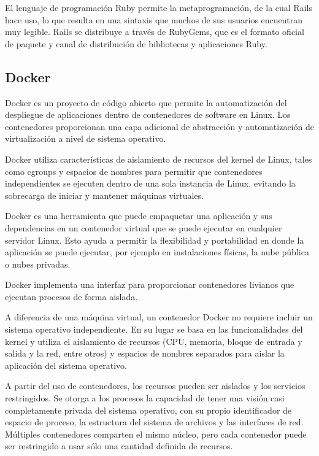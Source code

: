 El lenguaje de programación Ruby permite la metaprogramación, de la cual Rails
hace uso, lo que resulta en una sintaxis que muchos de sus usuarios encuentran
muy legible. Rails se distribuye a través de RubyGems, que es el formato
oficial de paquete y canal de distribución de bibliotecas y aplicaciones Ruby.

\subsection{Docker}

Docker es un proyecto de código abierto que permite la automatización del
despliegue de aplicaciones dentro de contenedores de software en Linux. Los
contenedores proporcionan una capa adicional de abstracción y automatización de
virtualización a nivel de sistema operativo.

Docker utiliza características de aislamiento de recursos del kernel de Linux,
tales como cgroups y espacios de nombres para permitir que contenedores
independientes se ejecuten dentro de una sola instancia de Linux, evitando la
sobrecarga de iniciar y mantener máquinas virtuales.

Docker es una herramienta que puede empaquetar una aplicación y sus
dependencias en un contenedor virtual que se puede ejecutar en cualquier
servidor Linux. Esto ayuda a permitir la flexibilidad y portabilidad en donde
la aplicación se puede ejecutar, por ejemplo en instalaciones físicas, la nube
pública o nubes privadas.

Docker implementa una interfaz para proporcionar contenedores livianos que
ejecutan procesos de forma aislada. 

A diferencia de una máquina virtual, un contenedor Docker no requiere incluir
un sistema operativo independiente. En su lugar se basa en las funcionalidades
del kernel y utiliza el aislamiento de recursos (CPU, memoria, bloque de
entrada y salida y la red, entre otros) y espacios de nombres separados para
aislar la aplicación del sistema operativo.

A partir del uso de contenedores, los recursos pueden ser aislados y los
servicios restringidos. Se otorga a los procesos la capacidad de tener una
visión casi completamente privada del sistema operativo, con su propio
identificador de espacio de proceso, la estructura del sistema de archivos y
las interfaces de red. Múltiples contenedores comparten el mismo núcleo, pero
cada contenedor puede ser restringido a usar sólo una cantidad definida de
recursos.

